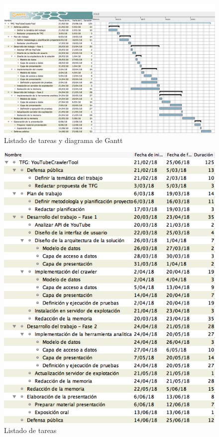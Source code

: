 \documentclass[11pt,a4paper]{article}
\begin{document}
\begin{figure}[H]
\centering
\includegraphics[scale=0.25]{planificacion/planificacion.png}
\caption{Listado de tareas y diagrama de Gantt}
\end{figure}

\begin{figure}[H]
\centering
\includegraphics[scale=0.4]{planificacion/listado-tareas.png}
\caption{Listado de tareas}
\end{figure}
\newpage
\end{document}
